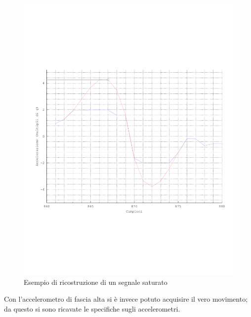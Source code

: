
	\begin{figure}
		\begin{center}
		\includegraphics[width=\columnwidth]{taybella_copia}
		\caption{Esempio di ricostruzione di un segnale saturato}
		\label{fig:ricostruzione}
		\end{center}
	\end{figure}

	Con l'accelerometro di fascia alta si è invece potuto acquisire
    il vero movimento; da questo si sono ricavate le specifiche
    sugli accelerometri.
    
